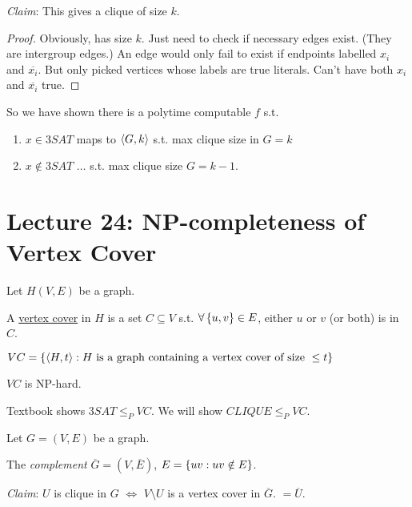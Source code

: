 \emph{Claim}: This gives a clique of size $k$.

\begin{proof}
    Obviously, has size $k$. Just need to check if necessary edges exist. (They are intergroup edges.) An edge would only fail to exist if endpoints labelled $x_i$ and $\overline{x_i}$. But only picked vertices whose labels are true literals. Can't have both $x_i$ and $\overline{x_i}$ true.
\end{proof}

So we have shown there is a polytime computable $f$ s.t.

\begin{enumerate}
    \item $x \in 3SAT$ maps to $\left \langle G, k \right \rangle$ s.t. max clique size in $G = k$
    \item  $x \notin 3SAT$ $\ldots$ s.t. max clique size $G = k - 1$.
\end{enumerate}

\section*{Lecture 24: NP-completeness of Vertex Cover}

Let $H(V, E)$ be a graph.

\begin{definition}
     A \underline{vertex cover} in $H$ is a set $C \subseteq V$ s.t. $\forall \left \{ u, v \right \} \in E$, either $u$ or $v$ (or both) is in $C$.
\end{definition}

\begin{definition}
    $VC = \left \{ \left \langle H, t \right \rangle : H \text{ is a graph containing a vertex cover of size } \leq t \right \}$
\end{definition}

\begin{theorem}
    $VC$ is NP-hard.
\end{theorem}

Textbook shows $3SAT \leq_{P} VC$. We will show $CLIQUE \leq_{P} VC$.

Let $G = (V, E)$ be a graph.

\begin{definition}
    The \emph{complement} $\overline{G} = (V, \overline{E})$, $E = \left \{ uv : uv \notin E \right \}$.
\end{definition}

\emph{Claim}: $U$ is clique in $G$ $\Leftrightarrow$ $V \setminus U$ is a vertex cover in $\overline{G}$. $= \overline{U}$.

